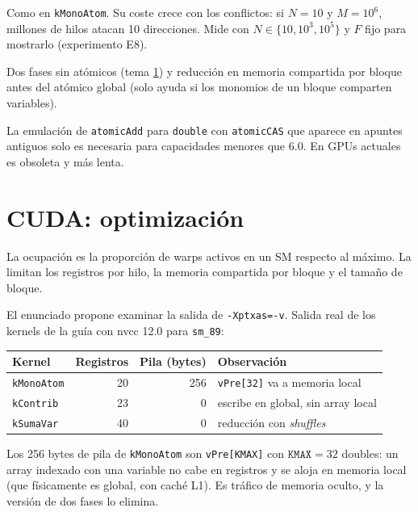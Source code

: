 \como Como en \texttt{kMonoAtom}. Su coste crece con los conflictos: si $N=10$ y $M=10^6$, millones de hilos atacan 10 direcciones. Mide con $N\in\{10,10^3,10^5\}$ y $F$ fijo para mostrarlo (experimento E8).

\alt Dos fases sin atómicos (tema \ref{tema:cudaOpt}) y reducción en memoria compartida por bloque antes del atómico global (solo ayuda si los monomios de un bloque comparten variables).

\begin{trampa}
La emulación de \texttt{atomicAdd} para \texttt{double} con \texttt{atomicCAS} que aparece en apuntes antiguos solo es necesaria para capacidades menores que 6.0. En GPUs actuales es obsoleta y más lenta.
\end{trampa}

\section{CUDA: optimización}\label{tema:cudaOpt}

\que La ocupación es la proporción de warps activos en un SM respecto al máximo. La limitan los registros por hilo, la memoria compartida por bloque y el tamaño de bloque.

\porque El enunciado propone examinar la salida de \texttt{-Xptxas=-v}. Salida real de los kernels de la guía con nvcc 12.0 para \texttt{sm\_89}:

\begin{center}\small
\begin{tabular}{@{}lrrl@{}}
\toprule
Kernel & Registros & Pila (bytes) & Observación \\
\midrule
\texttt{kMonoAtom} & 20 & 256 & \texttt{vPre[32]} va a memoria local \\
\texttt{kContrib} & 23 & 0 & escribe en global, sin array local \\
\texttt{kSumaVar} & 40 & 0 & reducción con \emph{shuffles} \\
\bottomrule
\end{tabular}
\end{center}

Los 256 bytes de pila de \texttt{kMonoAtom} son \texttt{vPre[KMAX]} con $\texttt{KMAX}=32$ doubles: un array indexado con una variable no cabe en registros y se aloja en memoria local (que físicamente es global, con caché L1). Es tráfico de memoria oculto, y la versión de dos fases lo elimina.

